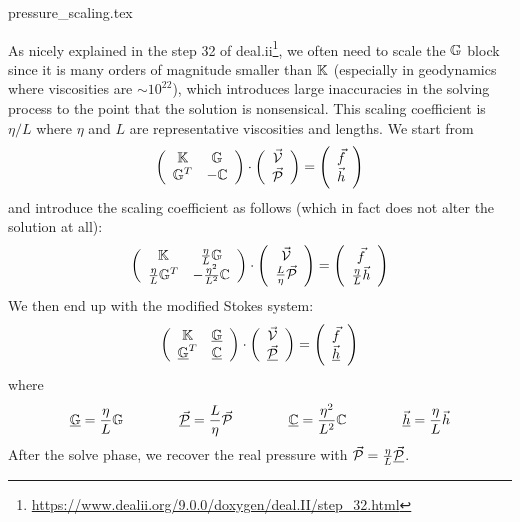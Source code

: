 \begin{flushright} {\tiny {\color{gray} pressure\_scaling.tex}} \end{flushright}

As nicely explained in the 
step 32 of deal.ii\footnote{\url{https://www.dealii.org/9.0.0/doxygen/deal.II/step\_32.html}},
we often need to scale the ${\mathbb{G}}$ block since it is many orders of magnitude smaller than ${\mathbb{K}}$ (especially in geodynamics where viscosities are $\sim 10^{22}$), 
which introduces large inaccuracies in the solving process to the point that the solution is nonsensical. 
This scaling coefficient is $\eta/L$ where $\eta$ and $L$ are representative viscosities and lengths. 
We start from 
\[
\left(
\begin{array}{cc}
{\mathbb{K}} & {\mathbb{G}} \\ {\mathbb{G}}^T & -{\mathbb{C}} 
\end{array}
\right)
\cdot
\left(
\begin{array}{c}
\vec{\cal V} \\ \vec{\cal P}
\end{array}
\right)
=
\left(
\begin{array}{c}
\vec{f} \\ \vec{h}
\end{array}
\right)
\]
and introduce the scaling coefficient as follows (which in fact does not alter the solution at all):
\[
\left(
\begin{array}{cc}
{\mathbb{K}} & \frac{\eta}{L}{\mathbb{G}} \\ \frac{\eta}{L}{\mathbb{G}}^T & - \frac{\eta^2}{L^2} {\mathbb{C}} 
\end{array}
\right)
\cdot
\left(
\begin{array}{c}
\vec{\cal V} \\\frac{L}{\eta} \vec{\cal P}
\end{array}
\right)
=
\left(
\begin{array}{c}
 \vec{f} \\ \frac{\eta}{L} \vec{h}
\end{array}
\right)
\]
We then end up with the modified Stokes system:
\[
\left(
\begin{array}{cc}
{\mathbb{K}} & \underline{{\mathbb{G}}} \\ \underline{{\mathbb{G}}}^T & \underline{{\mathbb{C}}} 
\end{array}
\right)
\cdot
\left(
\begin{array}{c}
\vec{\cal V} \\ \underline{\vec{\cal P}}
\end{array}
\right)
=
\left(
\begin{array}{c}
\vec{f} \\ \underline{\vec{h}}
\end{array}
\right)
\]
where 
\[
\underline{{\mathbb{G}}}=\frac{\eta}{L}{\mathbb{G}}
\quad\quad
\quad\quad
\underline{\vec{\cal P}}=\frac{L}{\eta} \vec{\cal P}
\quad\quad
\quad\quad
\underline{{\mathbb{C}}}=\frac{\eta^2}{L^2} {\mathbb{C}}
\quad\quad
\quad\quad
\underline{\vec{h}}=\frac{\eta}{L}\vec{h}
\]
After the solve phase, we recover the real pressure with $\vec{\cal P}=\frac{\eta}{L}\underline{\vec{\cal P}}$.





